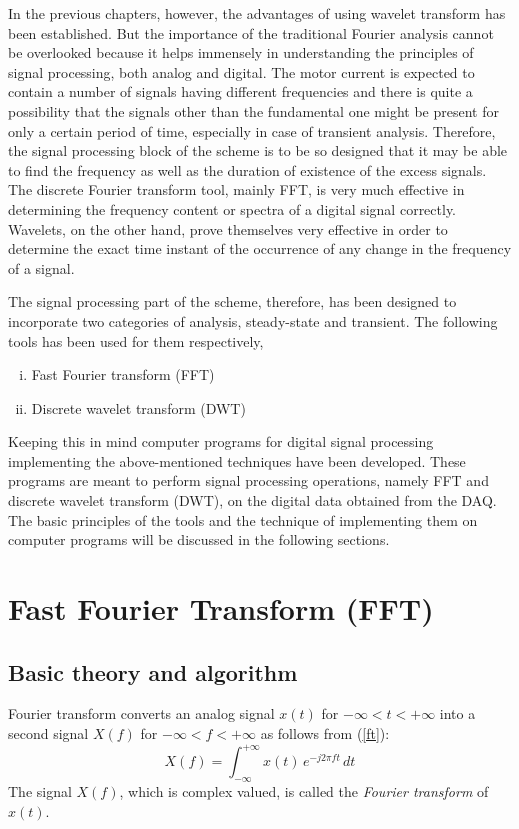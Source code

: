 \documentclass[a4paper,11pt]{report}
\begin{document}
In the previous chapters, however, the advantages of using wavelet transform has been established. But the importance of the traditional Fourier analysis cannot be overlooked because it helps immensely in understanding the principles of signal processing, both analog and digital. The motor current is expected to contain a number of signals having different frequencies and there is quite a possibility that the signals other than the fundamental one might be present for only a certain period of time, especially in case of transient analysis. Therefore, the signal processing block of the scheme is to be so designed that it may be able to find the frequency as well as the duration of existence of the excess signals. The discrete Fourier transform tool, mainly FFT, is very much effective in determining the frequency content or spectra of a digital signal correctly. Wavelets, on the other hand, prove themselves very effective in order to determine the exact time instant of the occurrence of any change in the frequency of a signal.

The signal processing part of the scheme, therefore, has been designed to incorporate two categories of analysis, steady-state and transient. The following tools has been used for them respectively,
\begin{enumerate}[(i)]
\item Fast Fourier transform (FFT)
\item Discrete wavelet transform (DWT)
\end{enumerate}

Keeping this in mind computer programs for digital signal processing implementing the above-mentioned techniques have been developed. These programs are meant to perform signal processing operations, namely FFT and discrete wavelet transform (DWT), on the digital data obtained from the DAQ. The basic principles of the tools and the technique of implementing them on computer programs will be discussed in the following sections.

\section{Fast Fourier Transform (FFT)}
\subsection{Basic theory and algorithm} \label{fftbas}
Fourier transform converts an analog signal $x(t)$ for $-\infty < t < +\infty$ into a second signal $X(f)$ for $-\infty < f < +\infty$ as follows from (\ref{ft}):
\begin{equation}
X(f) = \int_{-\infty}^{+\infty} x(t)\,e^{-j2\pi ft}\,dt
\end{equation}
The signal $X(f)$, which is complex valued, is called the \emph{Fourier transform} of $x(t)$.
\end{document}
